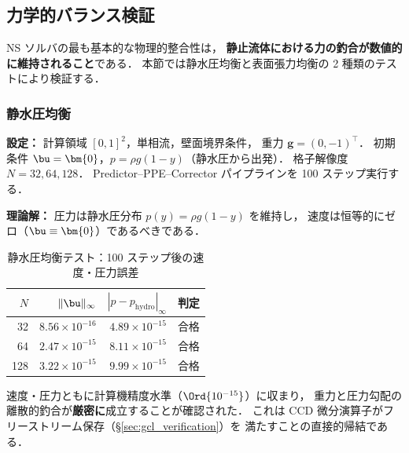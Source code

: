 %
\subsection{力学的バランス検証}
\label{sec:force_balance}

NS ソルバの最も基本的な物理的整合性は，
\textbf{静止流体における力の釣合が数値的に維持されること}である．
本節では静水圧均衡と表面張力均衡の 2 種類のテストにより検証する．

\subsubsection{静水圧均衡}
\label{sec:hydrostatic}

\textbf{設定：}
計算領域 $[0,1]^2$，単相流，壁面境界条件，
重力 $\bm{g} = (0, -1)^\top$．
初期条件 $\bu = \bm{0}$，$p = \rho g (1-y)$（静水圧から出発）．
格子解像度 $N = 32, 64, 128$．
Predictor--PPE--Corrector パイプラインを 100 ステップ実行する．

\textbf{理論解：}
圧力は静水圧分布 $p(y) = \rho g (1-y)$ を維持し，
速度は恒等的にゼロ（$\bu \equiv \bm{0}$）であるべきである．

\begin{table}[htbp]
\centering
\caption{静水圧均衡テスト：100 ステップ後の速度・圧力誤差}
\label{tab:hydrostatic}
\begin{tabular}{rrrc}
\toprule
$N$ & $\|\bu\|_\infty$ & $|p - p_{\mathrm{hydro}}|_\infty$ & 判定 \\
\midrule
32  & $8.56 \times 10^{-16}$ & $4.89 \times 10^{-15}$ & 合格 \\
64  & $2.47 \times 10^{-15}$ & $8.11 \times 10^{-15}$ & 合格 \\
128 & $3.22 \times 10^{-15}$ & $9.99 \times 10^{-15}$ & 合格 \\
\bottomrule
\end{tabular}
\end{table}

速度・圧力ともに計算機精度水準（$\Ord{10^{-15}}$）に収まり，
重力と圧力勾配の離散的釣合が\textbf{厳密に}成立することが確認された．
これは CCD 微分演算子がフリーストリーム保存（§\ref{sec:gcl_verification}）を
満たすことの直接的帰結である．

